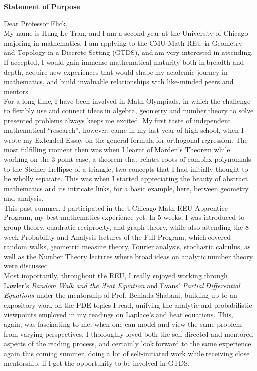 \documentclass[a4paper, 11pt]{extarticle}
\begin{document}
\pagestyle{empty}
\begin{center}
    \textbf{\Large{Statement of Purpose}}
\end{center}

Dear Professor Flick,\\

My name is Hung Le Tran, and I am a second year at the University of Chicago majoring in mathematics. I am applying to the CMU Math REU in Geometry and Topology  in a   Discrete Setting (GTDS), and am very interested in attending. If accepted, I would gain immense mathematical maturity both in breadth and depth, acquire new experiences that would shape my academic journey in mathematics, and build invaluable relationships with like-minded peers and mentors.\\

For a long time, I have been involved in Math Olympiads, in which the challenge to flexibly use and connect ideas in algebra, geometry and number theory to solve presented problems always keeps me excited. My first taste of independent mathematical “research”, however, came in my last year of high school, when I wrote my Extended Essay on the general formula for orthogonal regression. The most fulfilling moment then was when I learnt of Marden's Theorem while working on the 3-point case, a theorem that relates roots of complex polynomials to the Steiner inellipse of a triangle, two concepts that I had initially thought to be wholly separate. This was when I started appreciating the beauty of abstract mathematics and its intricate links, for a basic example, here, between geometry and analysis.\\

This past summer, I participated in the UChicago Math REU Apprentice Program, my best mathematics experience yet. In 5 weeks, I was introduced to group theory, quadratic reciprocity, and graph theory, while also attending the 8-week Probability and Analysis lectures of the Full Program, which covered random walks, geometric measure theory, Fourier analysis, stochastic calculus, as well as the Number Theory lectures where broad ideas on analytic number theory were discussed.\\

Most importantly, throughout the REU, I really enjoyed working through Lawler's \textit{Random Walk and the Heat Equation} and Evans' \textit{Partial Differential Equations} under the mentorship of Prof. Beniada Shabani, building up to an expository work on the PDE topics I read, unifying the analytic and probabilistic viewpoints employed in my readings on Laplace's and heat equations. This, again, was fascinating to me, when one can model and view the same problem from varying perspectives. I thoroughly loved both the self-directed and mentored aspects of the reading process, and certainly look forward to the same experience again this coming summer, doing a lot of self-initiated work while receiving close mentorship, if I get the opportunity to be involved in GTDS.\\
\end{document}
